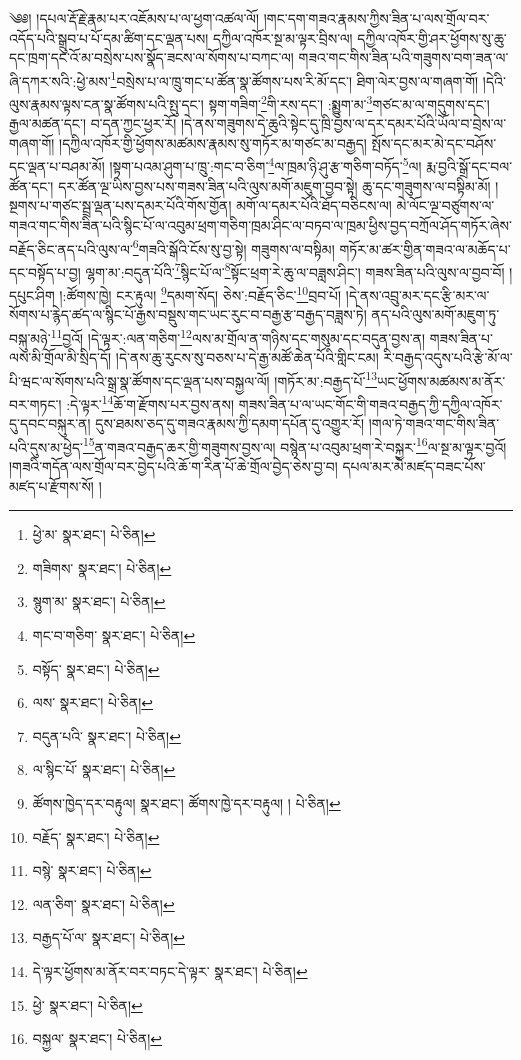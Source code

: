 \setcounter{footnote}{0} 
༄༅། །དཔལ་རྡོ་རྗེ་རྣམ་པར་འཇོམས་པ་ལ་ཕྱག་འཚལ་ལོ། །གང་དག་གཟའ་རྣམས་ཀྱིས་ཟིན་པ་ལས་གྲོལ་བར་འདོད་པའི་སྒྲུབ་པ་པོ་དམ་ཚིག་དང་ལྡན་པས། དཀྱིལ་འཁོར་སྔ་མ་ལྟར་བྲིས་ལ། དཀྱིལ་འཁོར་གྱི་ཤར་ཕྱོགས་སུ་ཆུ་དང་ཁྲག་དང་འོ་མ་བསྲེས་པས་སྣོད་ཟངས་ལ་སོགས་པ་བཀང་ལ། གཟའ་གང་གིས་ཟིན་པའི་གཟུགས་བག་ཟན་ལ་ཞི་དཀར་སའི་:ཕྱེ་མས་\footnote{ཕྱེ་མ་  སྣར་ཐང་།  པེ་ཅིན། }བསྲེས་པ་ལ་ཁྲུ་གང་པ་ཚོན་སྣ་ཚོགས་པས་རི་མོ་དང་། ཐིག་ལེར་བྱས་ལ་གཞག་གོ། །དེའི་ལུས་རྣམས་ལྟས་ངན་སྣ་ཚོགས་པའི་སྤུ་དང་། སྟག་གཟིག་\footnote{གཟིགས་  སྣར་ཐང་།  པེ་ཅིན། }གི་རས་དང་། :སྨྱུག་མ་\footnote{སྙུག་མ་  སྣར་ཐང་།  པེ་ཅིན། }གཙང་མ་ལ་གདུགས་དང་། རྒྱལ་མཚན་དང་། བ་དན་ཀྱང་ཕྱར་རོ། །དེ་ནས་གཟུགས་དེ་ཆུའི་སྟེང་དུ་ཁྲི་བྱས་ལ་དར་དམར་པོའི་ཡོལ་བ་བྲེས་ལ་གཞག་གོ། །དཀྱིལ་འཁོར་གྱི་ཕྱོགས་མཚམས་རྣམས་སུ་གཏོར་མ་གཙང་མ་བརྒྱད། སྤོས་དང་མར་མེ་དང་བཤོས་དང་ལྡན་པ་བཤམ་མོ། །སྟག་པའམ་ཤུག་པ་ཁྲུ་:གང་བ་ཅིག་\footnote{གང་བ་གཅིག་  སྣར་ཐང་།  པེ་ཅིན། }ལ་ཁྲམ་ཉི་ཤུ་རྩ་གཅིག་བཏོད་\footnote{བསྟོད་  སྣར་ཐང་།  པེ་ཅིན། }ལ། རྨ་བྱའི་སྒྲོ་དང་བལ་ཚོན་དང་། དར་ཚོན་ལྔ་ཡིས་བྱས་པས་གཟས་ཟིན་པའི་ལུས་མགོ་མཇུག་བྱབ་སྟེ། ཆུ་དང་གཟུགས་ལ་བསྟིམ་མོ། །སྔགས་པ་གཙང་སྦྲ་ལྡན་པས་དམར་པོའི་གོས་གྱོན། མགོ་ལ་དམར་པོའི་ཐོད་བཅིངས་ལ། མེ་ལོང་ལྔ་བཙུགས་ལ་གཟའ་གང་གིས་ཟིན་པའི་སྙིང་པོ་ལ་འབུམ་ཕྲག་གཅིག་ཁྲམ་ཤིང་ལ་བཏབ་ལ་ཁྲམ་ཕྱིས་བྱད་བཀྲོལ་ཤོད་གཏོར་ཞེས་བརྗོད་ཅིང་ནད་པའི་ལུས་ལ་\footnote{ལས་  སྣར་ཐང་།  པེ་ཅིན། }གཟའི་སྒོའི་ངོས་སུ་བྱ་སྟེ། གཟུགས་ལ་བསྟིམ། གཏོར་མ་ཚར་གྱིན་གཟའ་ལ་མཆོད་པ་དང་བསྟོད་པ་བྱ། ལྷག་མ་:བདུན་པོའི་\footnote{བདུན་པའི་  སྣར་ཐང་།  པེ་ཅིན། }སྙིང་པོ་ལ་\footnote{ལ་སྙིང་པོ་  སྣར་ཐང་།  པེ་ཅིན། }སྟོང་ཕྲག་རེ་ཆུ་ལ་བཟླས་ཤིང་། གཟས་ཟིན་པའི་ལུས་ལ་བྱབ་བོ། །དཔུང་ཤིག །:ཚོགས་ཁྱེ། ངར་རྟུལ། \footnote{ཚོགས་ཁྱེད་དར་བརྟུལ།   སྣར་ཐང་། ཚོགས་ཁྱེ་དར་བརྟུལ། །   པེ་ཅིན། }དམག་སོད། ཅེས་:བརྗོད་ཅིང་\footnote{བརྗོད་  སྣར་ཐང་།  པེ་ཅིན། }བྲབ་པོ། །དེ་ནས་འབྲུ་མར་དང་རྩི་མར་ལ་སོགས་པ་རྙེད་ཚད་ལ་སྙིང་པོ་རྒྱས་བསྡུས་གང་ཡང་རུང་བ་བརྒྱ་རྩ་བརྒྱད་བཟླས་ཏེ། ནད་པའི་ལུས་མགོ་མཇུག་ཏུ་བསྐུ་མཉེ་\footnote{བསྙེ་  སྣར་ཐང་།  པེ་ཅིན། }བྱའོ། །དེ་ལྟར་:ལན་གཅིག་\footnote{ལན་ཅིག་  སྣར་ཐང་།  པེ་ཅིན། }ལས་མ་གྲོལ་ན་གཉིས་དང་གསུམ་དང་བདུན་བྱས་ན། གཟས་ཟིན་པ་ལས་མི་གྲོལ་མི་སྲིད་དོ། །དེ་ནས་ཆུ་རུངས་སུ་བཅས་པ་དེ་རྒྱ་མཚོ་ཆེན་པོའི་གླིང་ངམ། རི་བརྒྱད་འདུས་པའི་རྩེ་མོ་ལ་པི་ཝང་ལ་སོགས་པའི་སྒྲ་སྣ་ཚོགས་དང་ལྡན་པས་བསྐྱལ་ལོ། །གཏོར་མ་:བརྒྱད་པོ་\footnote{བརྒྱད་པོ་ལ་  སྣར་ཐང་།  པེ་ཅིན། }ཡང་ཕྱོགས་མཚམས་མ་ནོར་བར་གཏང་། :དེ་ལྟར་\footnote{དེ་ལྟར་ཕྱོགས་མ་ནོར་བར་བཏང་དེ་ལྟར་  སྣར་ཐང་།  པེ་ཅིན། }ཆོ་ག་རྫོགས་པར་བྱས་ནས། གཟས་ཟིན་པ་ལ་ཡང་གོང་གི་གཟའ་བརྒྱད་ཀྱི་དཀྱིལ་འཁོར་དུ་དབང་བསྐུར་ན། དུས་ཐམས་ཅད་དུ་གཟའ་རྣམས་ཀྱི་དམག་དཔོན་དུ་འགྱུར་རོ། །གལ་ཏེ་གཟའ་གང་གིས་ཟིན་པའི་དུས་མ་ཕྱེད་\footnote{ཕྱེ་  སྣར་ཐང་།  པེ་ཅིན། }ན་གཟའ་བརྒྱད་ཆར་གྱི་གཟུགས་བྱས་ལ། བསྙེན་པ་འབུམ་ཕྲག་རེ་བསྐྱར་\footnote{བསྐྱལ་  སྣར་ཐང་།  པེ་ཅིན། }ལ་སྔ་མ་ལྟར་བྱའོ། །གཟའི་གདོན་ལས་གྲོལ་བར་བྱེད་པའི་ཆོ་ག་རིན་པོ་ཆེ་གྲོལ་བྱེད་ཅེས་བྱ་བ། དཔལ་མར་མེ་མཛད་བཟང་པོས་མཛད་པ་རྫོགས་སོ། ། 